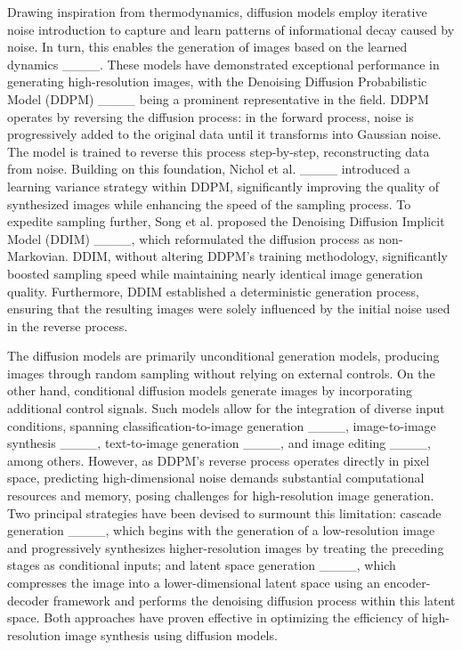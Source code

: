 Drawing inspiration from thermodynamics, diffusion models employ iterative noise introduction to capture and learn patterns of informational decay caused by noise. In turn, this enables the generation of images based on the learned dynamics ____. These models have demonstrated exceptional performance in generating high-resolution images, with the Denoising Diffusion Probabilistic Model (DDPM) ____ being a prominent representative in the field. DDPM operates by reversing the diffusion process: in the forward process, noise is progressively added to the original data until it transforms into Gaussian noise. The model is trained to reverse this process step-by-step, reconstructing data from noise. Building on this foundation, Nichol et al. ____ introduced a learning variance strategy within DDPM, significantly improving the quality of synthesized images while enhancing the speed of the sampling process. To expedite sampling further, Song et al. proposed the Denoising Diffusion Implicit Model (DDIM) ____, which reformulated the diffusion process as non-Markovian. DDIM, without altering DDPM's training methodology, significantly boosted sampling speed while maintaining nearly identical image generation quality. Furthermore, DDIM established a deterministic generation process, ensuring that the resulting images were solely influenced by the initial noise used in the reverse process.

The diffusion models are primarily unconditional generation models, producing images through random sampling without relying on external controls. On the other hand, conditional diffusion models generate images by incorporating additional control signals. Such models allow for the integration of diverse input conditions, spanning classification-to-image generation ____, image-to-image synthesis ____, text-to-image generation ____, and image editing ____, among others. However, as DDPM's reverse process operates directly in pixel space, predicting high-dimensional noise demands substantial computational resources and memory, posing challenges for high-resolution image generation. Two principal strategies have been devised to surmount this limitation: cascade generation ____, which begins with the generation of a low-resolution image and progressively synthesizes higher-resolution images by treating the preceding stages as conditional inputs; and latent space generation ____, which compresses the image into a lower-dimensional latent space using an encoder-decoder framework and performs the denoising diffusion process within this latent space. Both approaches have proven effective in optimizing the efficiency of high-resolution image synthesis using diffusion models.

